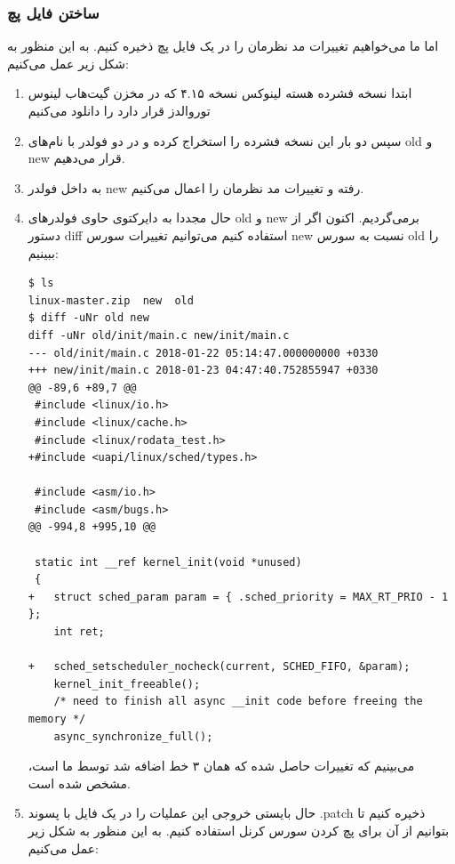 \documentclass{article}
\begin{document}
\subsubsection{ساختن فایل پچ\cite{6}}

اما ما می‌خواهیم تغییرات مد نظرمان را در یک فایل پچ ذخیره کنیم. به این منظور به شکل زیر عمل می‌کنیم:

\begin{enumerate}

\item ابتدا نسخه فشرده هسته لینوکس نسخه ۴.۱۵ که در مخزن گیت‌هاب لینوس توروالدز\cite{7} قرار دارد را دانلود می‌کنیم

\item سپس دو بار این نسخه فشرده را استخراج کرده و در دو فولدر با نام‌های old و new قرار می‌دهیم.

\item به داخل فولدر new رفته و تغییرات مد نظرمان را اعمال می‌‌کنیم.

\item حال مجددا به دایرکتوی حاوی فولدر‌های old و new برمی‌گردیم.
اکنون اگر از دستور diff استفاده کنیم می‌توانیم تغییرات سورس new نسبت به سورس old را ببینیم:

\begin{latin}
\begin{verbatim}
$ ls
linux-master.zip  new  old
$ diff -uNr old new
diff -uNr old/init/main.c new/init/main.c
--- old/init/main.c	2018-01-22 05:14:47.000000000 +0330
+++ new/init/main.c	2018-01-23 04:47:40.752855947 +0330
@@ -89,6 +89,7 @@
 #include <linux/io.h>
 #include <linux/cache.h>
 #include <linux/rodata_test.h>
+#include <uapi/linux/sched/types.h>
 
 #include <asm/io.h>
 #include <asm/bugs.h>
@@ -994,8 +995,10 @@
 
 static int __ref kernel_init(void *unused)
 {
+	struct sched_param param = { .sched_priority = MAX_RT_PRIO - 1 };
 	int ret;
 
+	sched_setscheduler_nocheck(current, SCHED_FIFO, &param);
 	kernel_init_freeable();
 	/* need to finish all async __init code before freeing the memory */
 	async_synchronize_full();
\end{verbatim}
\end{latin}
می‌بینیم که تغییرات حاصل شده که همان ۳ خط اضافه شد توسط ما است، مشخص شده است.

\item حال بایستی خروجی این عملیات را در یک فایل با پسوند .patch ذخیره کنیم تا بتوانیم از آن برای پچ کردن سورس کرنل استفاده کنیم. به این منظور به شکل زیر عمل می‌کنیم:


\end{enumerate}
\end{document}
